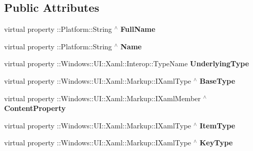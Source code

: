 \subsection*{Public Attributes}
\begin{DoxyCompactItemize}
\item 
virtual property \+::Platform\+::\+String $^\wedge$ {\bfseries Full\+Name}
\item 
virtual property \+::Platform\+::\+String $^\wedge$ {\bfseries Name}
\item 
virtual property \+::Windows\+::\+U\+I\+::\+Xaml\+::\+Interop\+::\+Type\+Name {\bfseries Underlying\+Type}
\item 
virtual property \+::Windows\+::\+U\+I\+::\+Xaml\+::\+Markup\+::\+I\+Xaml\+Type $^\wedge$ {\bfseries Base\+Type}
\item 
virtual property \+::Windows\+::\+U\+I\+::\+Xaml\+::\+Markup\+::\+I\+Xaml\+Member $^\wedge$ {\bfseries Content\+Property}
\item 
virtual property \+::Windows\+::\+U\+I\+::\+Xaml\+::\+Markup\+::\+I\+Xaml\+Type $^\wedge$ {\bfseries Item\+Type}
\item 
virtual property \+::Windows\+::\+U\+I\+::\+Xaml\+::\+Markup\+::\+I\+Xaml\+Type $^\wedge$ {\bfseries Key\+Type}
\end{DoxyCompactItemize}
